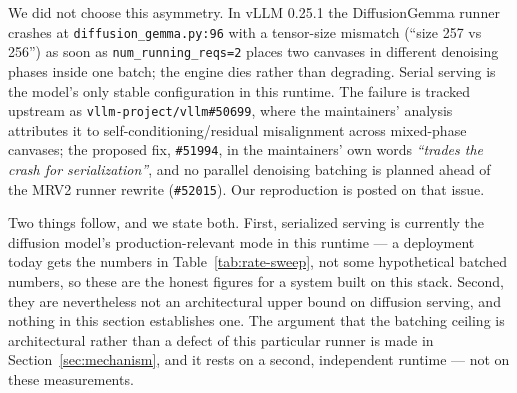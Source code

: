We did not choose this asymmetry. In vLLM 0.25.1 the DiffusionGemma runner
crashes at \texttt{diffusion\_gemma.py:96} with a tensor-size mismatch
(``size 257 vs 256'') as soon as \texttt{num\_running\_reqs=2} places two
canvases in different denoising phases inside one batch; the engine dies rather
than degrading. Serial serving is the model's only stable configuration in this
runtime. The failure is tracked upstream as
\texttt{vllm-project/vllm\#50699}, where the maintainers' analysis attributes it
to self-conditioning/residual misalignment across mixed-phase canvases; the
proposed fix, \texttt{\#51994}, in the maintainers' own words \emph{``trades the
crash for serialization''}, and no parallel denoising batching is planned ahead
of the MRV2 runner rewrite (\texttt{\#52015}). Our reproduction is posted on
that issue.

Two things follow, and we state both. First, serialized serving is currently the
diffusion model's production-relevant mode in this runtime --- a deployment
today gets the numbers in Table~\ref{tab:rate-sweep}, not some hypothetical
batched numbers, so these are the honest figures for a system built on this
stack. Second, they are nevertheless not an architectural upper bound on
diffusion serving, and nothing in this section establishes one. The argument
that the batching ceiling is architectural rather than a defect of this
particular runner is made in Section~\ref{sec:mechanism}, and it rests on a
second, independent runtime --- not on these measurements.
